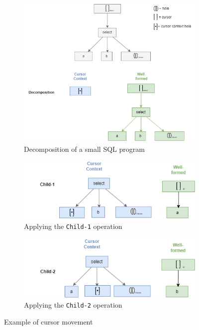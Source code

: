 \documentclass[sigplan,review]{acmart}
\begin{document}
\begin{figure}[H]
  \centering
  \begin{subfigure}[b]{0.9\linewidth}
    \centering
    \includegraphics[width=\linewidth]{img/slq-decomp-only.drawio.png}
    \caption{Decomposition of a small SQL program}
    \label{subfig:decomp-only}
  \end{subfigure}
  \hfill
  \begin{subfigure}[b]{0.9\linewidth}
    \centering
    \includegraphics[width=\linewidth]{img/sql-child1.drawio.png}
    \caption{Applying the \texttt{Child-1} operation}
    \label{subfig:child1}
  \end{subfigure}
  \hfill
  \begin{subfigure}[b]{0.9\linewidth}
    \centering
    \includegraphics[width=\linewidth]{img/sql-child2.drawio.png}
    \caption{Applying the \texttt{Child-2} operation}
    \label{subfig:child2}
  \end{subfigure}
  \caption{Example of cursor movement}
  \label{fig:movement-example}
\end{figure}
\end{document}
